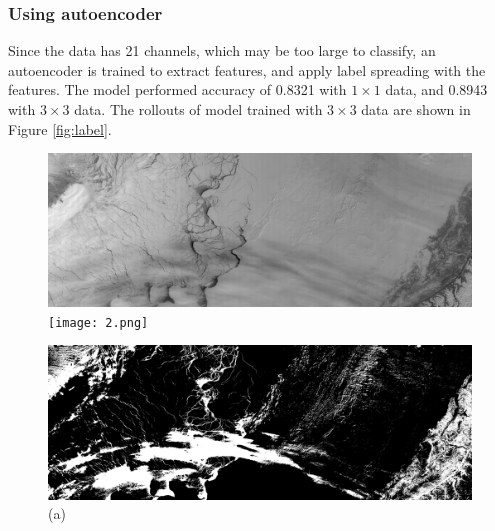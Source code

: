 \documentclass{article}
\begin{document}
        \subsubsection{Using autoencoder}
            Since the data has 21 channels,
            which may be too large to classify,
            an autoencoder is trained to extract features,
            and apply label spreading with the features.
            The model performed accuracy of 0.8321 with $1\times 1$ data,
            and 0.8943 with $3\times 3$ data.
            The rollouts of model trained with $3\times 3$ data
            are shown in Figure \ref{fig:label}.

            \begin{figure}[ht]
                \centering
                \begin{minipage}{0.49\hsize}
                    \centering
                    \includegraphics[width = 1\hsize]{1.png}
                    \texttt{[image: 2.png]}
                    \caption*{(a)}
                \end{minipage}
                \begin{minipage}{0.49\hsize}
                    \centering
                    \includegraphics[width = 1\hsize]{1_label.png}

\end{minipage}
\end{figure}
\end{document}
